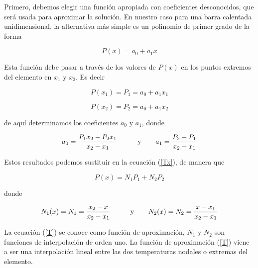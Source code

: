 \documentclass[10pt,a4paper]{article}
\begin{document}
Primero, debemos elegir una funci\'on apropiada con coeficientes desconocidos, que ser\'a usada para aproximar la soluci\'on. En nuestro caso para una barra calentada unidimensional, la alternativa m\'as simple es un polinomio de primer grado de la forma

\begin{equation}\label{Tx}
  P(x) = a_0+a_1x
\end{equation}

Esta funci\'on debe pasar a trav\'es de los valores de $P(x)$ en los puntos extremos del elemento en $x_1$ y $x_2$. Es decir

\begin{equation}\label{Tx1}
  P(x_1) = P_1=a_0+a_1x_1
\end{equation}

\begin{equation}\label{Tx2}
  P(x_2) = P_2=a_0+a_1x_2
\end{equation}

\noindent de aqu\'i determinamos los coeficientes $a_0$ y $a_1$, donde

\begin{equation}\label{a0ya1}
  \displaystyle a_0=\frac{P_1x_2-P_2x_1}{x_2-x_1} \hspace*{0.9cm} \mbox { y } \hspace*{0.6cm} a_1=\frac{P_2-P_1}{x_2-x_1}
\end{equation}

\noindent Estos resultados podemos sustituir en la ecuaci\'on (\ref{Tx}), de manera que

\begin{equation}\label{T}
  P(x) = N_1P_1+N_2P_2
\end{equation}

\noindent donde

\begin{equation}\label{N1yN2}
  \displaystyle N_1(x)=N_1=\frac{x_2-x}{x_2-x_1} \hspace*{0.9cm} \mbox { y } \hspace*{0.6cm} N_2(x)=N_2=\frac{x-x_1}{x_2-x_1}
\end{equation}

La ecuaci\'on (\ref{T}) se conoce como funci\'on de aproximaci\'on, $N_1$ y $N_2$ son funciones de interpolaci\'on de orden uno. La funci\'on de aproximaci\'on (\ref{T}) viene a ser una interpolaci\'on lineal entre las dos temperaturas nodales o extremas del elemento.
\end{document}
